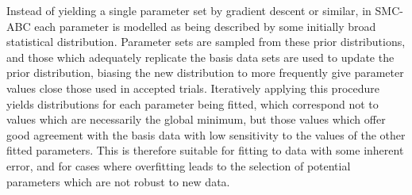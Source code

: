 Instead of yielding a single parameter set by gradient descent or similar, in SMC-ABC each parameter is modelled as being described by some initially broad statistical distribution.
Parameter sets are sampled from these prior distributions, and those which adequately replicate the basis data sets are used to update the prior distribution, biasing the new distribution to more frequently give parameter values close those used in accepted trials.
Iteratively applying this procedure yields distributions for each parameter being fitted, which correspond not to values which are necessarily the global minimum, but those values which offer good agreement with the basis data with low sensitivity to the values of the other fitted parameters.
This is therefore suitable for fitting to data with some inherent error, and for cases where overfitting leads to the selection of potential parameters which are not robust to new data.
